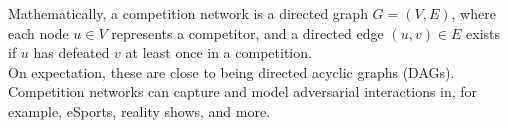 \documentclass[preview]{standalone}
\begin{document}
Mathematically, a competition network is a directed graph $G = (V, E)$, where each node $u \in V$ represents a competitor, and a directed edge $(u, v) \in E$ exists if $u$ has defeated $v$ at least once in a competition.\\On expectation, these are close to being directed acyclic graphs (DAGs).\\Competition networks can capture and model adversarial interactions in, for example, eSports, reality shows, and more.\\
\end{document}
